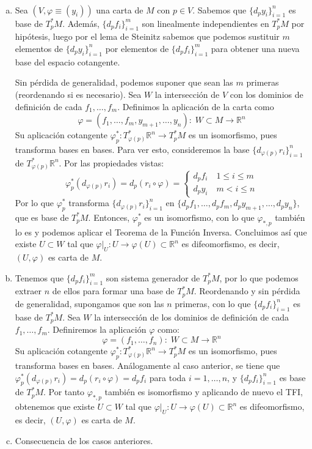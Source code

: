 \begin{dem}\, \vspace{-3mm}
\begin{enumerate}[a)] 
\item Sea $(V,\varphi\equiv(y_i))$ una carta de $M$ con $p \in V$. Sabemos que $\{d_py_i\}_{i=1}^n$ es base de $T^*_pM$. Además, $\{d_pf_i\}_{i=1}^m$ son linealmente independientes en $T^*_pM$ por hipótesis, luego por el lema de Steinitz sabemos que podemos sustituir $m$ elementos de $\{d_py_i\}_{i=1}^n$ por elementos de $\{d_pf_i\}_{i=1}^m$ para obtener una nueva base del espacio cotangente.

Sin pérdida de generalidad, podemos suponer que sean las $m$ primeras (reordenando si es necesario). Sea $W$ la intersección de $V$ con los dominios de definición de cada $f_1,\dots,f_m$. Definimos la aplicación de la carta como
$$\varphi = (f_1,\dots,f_m,y_{m+1},\dots,y_n) :\; W \subset M \longrightarrow \mathbb{R}^n$$
Su aplicación cotangente $\varphi^*_p:T^*_{\varphi(p)}\mathbb{R}^n \longrightarrow T^*_p M$ es un isomorfismo, pues transforma bases en bases. Para ver esto, consideremos la base $\{d_{\varphi(p)}r_i\}_{i=1}^n$ de $T^*_{\varphi(p)}\mathbb{R}^n$. Por las propiedades vistas: $$\varphi^*_p(d_{\varphi(p)}r_i) = d_p(r_i \circ \varphi) = \begin{cases}
d_pf_i \quad 1\leq i \leq m\\
d_py_i \quad m < i \leq n
\end{cases}$$
Por lo que $\varphi^*_p$ transforma $\{d_{\varphi(p)}r_i\}_{i=1}^n$ en $\{d_pf_1,\dots,d_pf_m,d_py_{m+1},\dots,d_py_n\}$, que es base de $T^*_pM$. Entonces, $\varphi^*_p$ es un isomorfismo, con lo que $\varphi_{*,p}$ también lo es y podemos aplicar el Teorema de la Función Inversa. Concluimos así que existe $U \subset W$ tal que $\varphi|_U:U \to \varphi(U) \subset \mathbb{R}^n$ es difeomorfismo, es decir, $(U,\varphi)$ es carta de $M$.

\item Tenemos que $\{d_pf_i\}_{i=1}^m$ son sistema generador de $T^*_pM$, por lo que podemos extraer $n$ de ellos para formar una base de $T^*_pM$. Reordenando y sin pérdida de generalidad, supongamos que son las $n$ primeras, con lo que $\{d_pf_i\}_{i=1}^n$ es base de $T^*_pM$. Sea $W$ la intersección de los dominios de definición de cada $f_1,\dots,f_m$. Definiremos la aplicación $\varphi$ como:
$$\varphi = (f_1,\dots,f_n) :\; W \subset M \longrightarrow \mathbb{R}^n$$
Su aplicación cotangente $\varphi^*_p:T^*_{\varphi(p)}\mathbb{R}^n \longrightarrow T^*_p M$ es un isomorfismo, pues transforma bases en bases. Análogamente al caso anterior, se tiene que $\varphi^*_p(d_{\varphi(p)}r_i) = d_p(r_i \circ \varphi) = d_pf_i$ para toda $i= 1,\dots,n$, y $\{d_pf_i\}_{i=1}^n$ es base de $T^*_pM$. Por tanto $\varphi_{*,p}$ también es isomorfismo y aplicando de nuevo el TFI, obtenemos que existe $U \subset W$ tal que $\varphi|_U:U \to \varphi(U) \subset \mathbb{R}^n$ es difeomorfismo, es decir, $(U,\varphi)$ es carta de $M$.
\item Consecuencia de los casos anteriores.
\end{enumerate}  
\end{dem}
\cleardoublepage